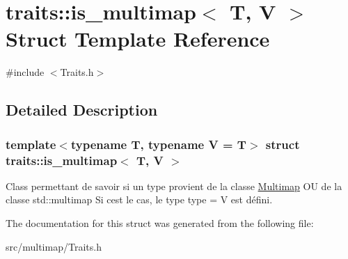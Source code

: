 \hypertarget{structtraits_1_1is__multimap}{}\section{traits\+:\+:is\+\_\+multimap$<$ T, V $>$ Struct Template Reference}
\label{structtraits_1_1is__multimap}


{\ttfamily \#include $<$Traits.\+h$>$}



\subsection{Detailed Description}
\subsubsection*{template$<$typename T, typename V = T$>$\newline
struct traits\+::is\+\_\+multimap$<$ T, V $>$}

Class permettant de savoir si un type provient de la classe \hyperlink{classMultimap}{Multimap} OU de la classe std\+::multimap Si c\textquotesingle{}est le cas, le type type = V est défini. 

The documentation for this struct was generated from the following file\+:\begin{DoxyCompactItemize}
\item 
src/multimap/Traits.\+h\end{DoxyCompactItemize}
